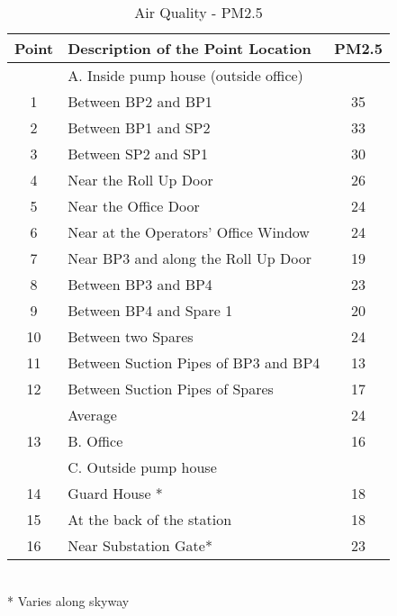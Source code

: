 \begin{table}[h]
	\caption{Air Quality - PM2.5}
	\label{ch04_tbl_wem03}
	\footnotesize{
	
\begin{tabular}{c|l|c}
\hline
Point & Description of the Point Location & PM2.5 \\ 
\hline
 & A. Inside pump house (outside office) &  \\ 
1 & Between BP2 and BP1 & 35 \\ 
2 & Between BP1 and SP2 & 33 \\ 
3 & Between SP2 and SP1 & 30 \\ 
4 & Near the Roll Up Door & 26 \\ 
5 & Near the Office Door & 24 \\ 
6 & Near at the Operators’ Office Window & 24 \\ 
7 & Near BP3 and along the Roll Up Door & 19 \\ 
8 & Between BP3 and BP4 & 23 \\ 
9 & Between BP4 and Spare 1 & 20 \\ 
10 & Between two Spares & 24 \\ 
11 & Between Suction Pipes of BP3 and BP4 & 13 \\ 
12 & Between Suction Pipes of Spares & 17 \\ 
 & Average & 24 \\ 
\hline
13 & B. Office & 16 \\ 
\hline
 & C. Outside pump house &  \\ 
14 & Guard House * & 18 \\ 
15 & At the back of the station & 18 \\ 
16 & Near Substation Gate* & 23 \\ 
\hline
\end{tabular}
\\ * Varies along skyway
}

\end{table}

